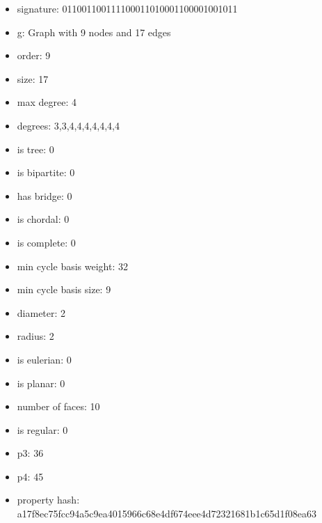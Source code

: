 \newpage
\begin{figure}
\end{figure}
\begin{itemize}
\item signature: 011001100111100011010001100001001011
\item g: Graph with 9 nodes and 17 edges
\item order: 9
\item size: 17
\item max degree: 4
\item degrees: 3,3,4,4,4,4,4,4,4
\item is tree: 0
\item is bipartite: 0
\item has bridge: 0
\item is chordal: 0
\item is complete: 0
\item min cycle basis weight: 32
\item min cycle basis size: 9
\item diameter: 2
\item radius: 2
\item is eulerian: 0
\item is planar: 0
\item number of faces: 10
\item is regular: 0
\item p3: 36
\item p4: 45
\item property hash: a17f8ec75fcc94a5c9ea4015966c68e4df674eee4d72321681b1c65d1f08ea63
\end{itemize}
